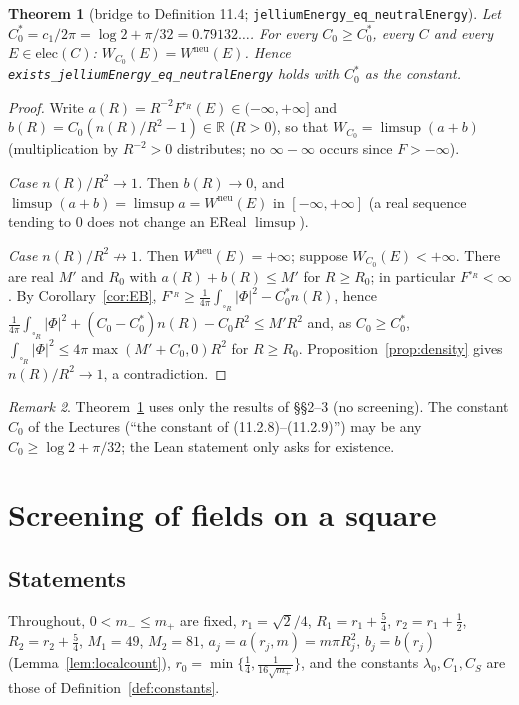 \documentclass[11pt]{article}
\newtheorem{theorem}{Theorem}[section]
\theoremstyle{definition}
\theoremstyle{remark}
\newtheorem{remark}[theorem]{Remark}
\newcommand{\R}{\mathbb R}
\newcommand{\Wneu}{W^{\mathrm{neu}}}
\begin{document}
\begin{theorem}[bridge to Definition 11.4; \texttt{jelliumEnergy\_eq\_neutralEnergy}]\label{thm:R2prime}
Let $C_0^\ast=c_1/2\pi=\log2+\pi/32=0.79132\ldots$. For every $C_0\ge C_0^\ast$, every $C$ and every $E\in\mathrm{elec}(C)$:
$W_{C_0}(E)=\Wneu(E)$. Hence \texttt{exists\_jelliumEnergy\_eq\_neutralEnergy} holds with $C_0^\ast$ as the constant.
\end{theorem}
\begin{proof}
Write $a(R)=R^{-2}F^{\square_R}(E)\in(-\infty,+\infty]$ and $b(R)=C_0(n(R)/R^2-1)\in\R$ ($R>0$), so that $W_{C_0}=\limsup(a+b)$ (multiplication
by $R^{-2}>0$ distributes; no $\infty-\infty$ occurs since $F>-\infty$).

\emph{Case $n(R)/R^2\to1$.} Then $b(R)\to0$, and $\limsup(a+b)=\limsup a=\Wneu(E)$ in $[-\infty,+\infty]$ (a real sequence tending to $0$ does not change an
EReal $\limsup$).

\emph{Case $n(R)/R^2\not\to1$.} Then $\Wneu(E)=+\infty$; suppose $W_{C_0}(E)<+\infty$. There are real $M'$ and $R_0$ with $a(R)+b(R)\le M'$ for
$R\ge R_0$; in particular $F^{\square_R}<\infty$. By Corollary~\ref{cor:EB}, $F^{\square_R}\ge\frac1{4\pi}\int_{\square_R}|\Phi|^2-C_0^\ast n(R)$, hence
$\frac1{4\pi}\int_{\square_R}|\Phi|^2+(C_0-C_0^\ast)n(R)-C_0R^2\le M'R^2$ and, as $C_0\ge C_0^\ast$,
$\int_{\square_R}|\Phi|^2\le4\pi\max(M'+C_0,0)R^2$ for $R\ge R_0$. Proposition~\ref{prop:density} gives $n(R)/R^2\to1$, a contradiction.
\end{proof}

\begin{remark}
Theorem~\ref{thm:R2prime} uses only the results of \S\S2--3 (no screening). The constant $C_0$ of the Lectures (``the constant of (11.2.8)--(11.2.9)'')
may be any $C_0\ge\log2+\pi/32$; the Lean statement only asks for existence.
\end{remark}

\section{Screening of fields on a square}\label{sec:screening}

\subsection{Statements}
Throughout, $0<m_-\le m_+$ are fixed, $r_1=\sqrt2/4$, $R_1=r_1+\frac54$, $r_2=r_1+\frac12$, $R_2=r_2+\frac54$, $M_1=49$, $M_2=81$,
$a_j=a(r_j,m)=m\pi R_j^2$, $b_j=b(r_j)$ (Lemma~\ref{lem:localcount}), $r_0=\min\{\frac14,\frac1{16\sqrt{m_+}}\}$, and the constants
$\lambda_0,C_1,C_S$ are those of Definition~\ref{def:constants}.
\end{document}

